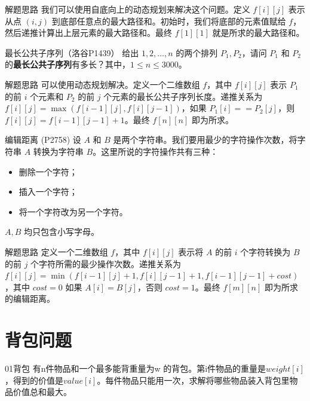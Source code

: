 \documentclass{beamer}
\begin{document}
\begin{frame}{解题思路}
    我们可以使用自底向上的动态规划来解决这个问题。定义 $f[i][j]$ 表示从点 $(i, j)$ 到底部任意点的最大路径和。初始时，我们将底部的元素值赋给 $f$，然后递推计算出上层元素的最大路径和。最终 $f[1][1]$ 就是所求的最大路径和。
\end{frame}

\begin{frame}{最长公共子序列（洛谷P1439）}
    给出 $1, 2, \dots, n$ 的两个排列 $P_1, P_2$，请问 $P_1$ 和 $P_2$ 的\textbf{最长公共子序列}有多长？其中，$1\leq n\leq 3000$。
\end{frame}

\begin{frame}{解题思路}
    可以使用动态规划解决。定义一个二维数组 $f$，其中 $f[i][j]$ 表示 $P_1$ 的前 $i$ 个元素和 $P_2$ 的前 $j$ 个元素的最长公共子序列长度。递推关系为 $f[i][j] = \max(f[i-1][j], f[i][j-1])$，如果 $P_1[i] == P_2[j]$，则 $f[i][j] = f[i-1][j-1] + 1$。最终 $f[n][n]$ 即为所求。
\end{frame}

\begin{frame}{编辑距离 (P2758)}
    设 $A$ 和 $B$ 是两个字符串。我们要用最少的字符操作次数，将字符串 $A$ 转换为字符串 $B$。这里所说的字符操作共有三种：
    \begin{itemize}
        \item 删除一个字符；
        \item 插入一个字符；
        \item 将一个字符改为另一个字符。
    \end{itemize}
    $A, B$ 均只包含小写字母。
\end{frame}

\begin{frame}{解题思路}
    定义一个二维数组 $f$，其中 $f[i][j]$ 表示将 $A$ 的前 $i$ 个字符转换为 $B$ 的前 $j$ 个字符所需的最少操作次数。递推关系为 $f[i][j] = \min(f[i-1][j] + 1, f[i][j-1] + 1, f[i-1][j-1] + cost)$，其中 $cost = 0$ 如果 $A[i] = B[j]$，否则 $cost = 1$。最终 $f[m][n]$ 即为所求的编辑距离。
\end{frame}

\section{背包问题}

\begin{frame}{01背包}
    有n件物品和一个最多能背重量为w 的背包。第i件物品的重量是$weight[i]$，得到的价值是$value[i]$。每件物品只能用一次，求解将哪些物品装入背包里物品价值总和最大。
\end{frame}
\end{document}
